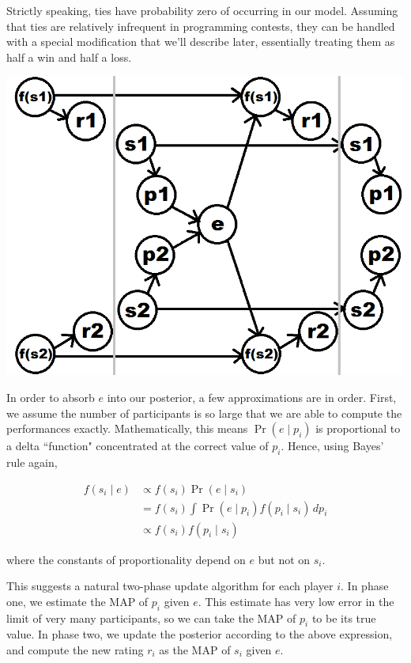 \documentclass{article}
\begin{document}
Strictly speaking, ties have probability zero of occurring in our model. Assuming that ties are relatively infrequent in programming contests, they can be handled with a special modification that we'll describe later, essentially treating them as half a win and half a loss.

\begin{center} \includegraphics[scale=0.35]{../images/HMMlabeled.png} \end{center}

In order to absorb $e$ into our posterior, a few approximations are in order. First, we assume the number of participants is so large that we are able to compute the performances exactly. Mathematically, this means $\Pr(e \mid p_i)$ is proportional to a delta ``function" concentrated at the correct value of $p_i$. Hence, using Bayes' rule again,

\begin{align*}
f(s_i\mid e)
&\propto f(s_i)\Pr(e\mid s_i)
\\&= f(s_i)\int \Pr(e\mid p_i)f(p_i\mid s_i)\,dp_i
\\&\propto f(s_i)f(p_i\mid s_i)
\end{align*}

where the constants of proportionality depend on $e$ but not on $s_i$.

This suggests a natural two-phase update algorithm for each player $i$. In phase one, we estimate the MAP of $p_i$ given $e$. This estimate has very low error in the limit of very many participants, so we can take the MAP of $p_i$ to be its true value. In phase two, we update the posterior according to the above expression, and compute the new rating $r_i$ as the MAP of $s_i$ given $e$.
\end{document}
